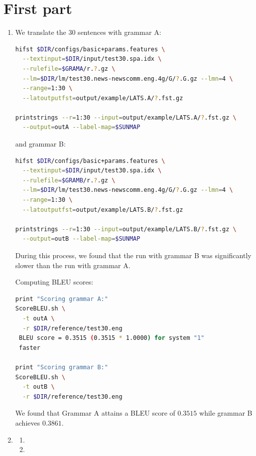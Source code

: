 \documentclass[a4paper,oneside,reqno]{amsart}
\begin{document}
\section{First part}

\begin{enumerate}[label=\arabic*.]
  \item
    We translate the 30 sentences with grammar A:
    \begin{lstlisting}[language=bash]
hifst $DIR/configs/basic+params.features \
  --textinput=$DIR/input/test30.spa.idx \
  --rulefile=$GRAMA/r.?.gz \
  --lm=$DIR/lm/test30.news-newscomm.eng.4g/G/?.G.gz --lmn=4 \
  --range=1:30 \
  --latoutputfst=output/example/LATS.A/?.fst.gz

printstrings --r=1:30 --input=output/example/LATS.A/?.fst.gz \
  --output=outA --label-map=$SUNMAP
    \end{lstlisting}
    and grammar B:
    \begin{lstlisting}[language=bash]
hifst $DIR/configs/basic+params.features \
  --textinput=$DIR/input/test30.spa.idx \
  --rulefile=$GRAMB/r.?.gz \
  --lm=$DIR/lm/test30.news-newscomm.eng.4g/G/?.G.gz --lmn=4 \
  --range=1:30 \
  --latoutputfst=output/example/LATS.B/?.fst.gz

printstrings --r=1:30 --input=output/example/LATS.B/?.fst.gz \
  --output=outB --label-map=$SUNMAP
    \end{lstlisting}
    During this process, we found that the run with grammar B was significantly slower
    than the run with grammar A.

    Computing BLEU scores:
    \begin{lstlisting}[language=bash]
print "Scoring grammar A:"
ScoreBLEU.sh \
  -t outA \
  -r $DIR/reference/test30.eng
 BLEU score = 0.3515 (0.3515 * 1.0000) for system "1"
 faster

print "Scoring grammar B:"
ScoreBLEU.sh \
  -t outB \
  -r $DIR/reference/test30.eng
    \end{lstlisting}
    We found that Grammar A attains a BLEU score of $0.3515$ while grammar B
    achieves $0.3861$.


  \item
    \begin{enumerate}[label=(\alph*)]
      \item
      \item
    \end{enumerate}


\end{enumerate}
\end{document}
